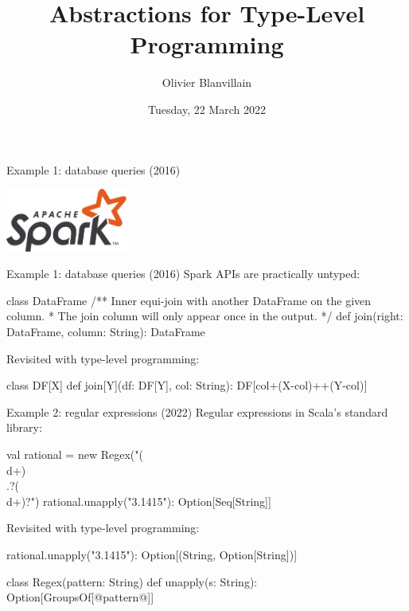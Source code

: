 \documentclass[10pt]{beamer}
\title{Abstractions for Type-Level Programming}
\date{Tuesday, 22 March 2022}
\author{Olivier Blanvillain}
\newenvironment{slide}[2][]
  {\begin{frame}[fragile,environment=slide,#1]{#2}}
  {\end{frame}}
\begin{document}
\maketitle

\begin{slide}{Example 1: database queries (2016)}
\begin{center}
\includegraphics[width=0.3\textwidth]{figures/spark.pdf}
\end{center}
\end{slide}

\begin{slide}{Example 1: database queries (2016)}
Spark APIs are practically untyped:
\begin{code}
class DataFrame {
  /** Inner equi-join with another DataFrame on the given column.
   *  The join column will only appear once in the output. */
  def join(right: DataFrame, column: String): DataFrame
}
\end{code}
\pause
Revisited with type-level programming:
\begin{code}
class DF[X] {
  def join[Y](df: DF[Y], col: String): DF[col+(X-col)++(Y-col)]
}
\end{code}
\end{slide}

\begin{slide}{Example 2: regular expressions (2022)}
Regular expressions in Scala's standard library:
\begin{code}
val rational = new Regex("(\\d+)\\.?(\\d+)?")
rational.unapply("3.1415"): Option[Seq[String]]
\end{code}
\pause
Revisited with type-level programming:
\begin{code}
rational.unapply("3.1415"): Option[(String, Option[String])]
\end{code}
\pause
\begin{code}
class Regex(pattern: String) {
  def unapply(s: String): Option[GroupsOf[@pattern@]]
}
\end{code}
\end{slide}
\end{document}
